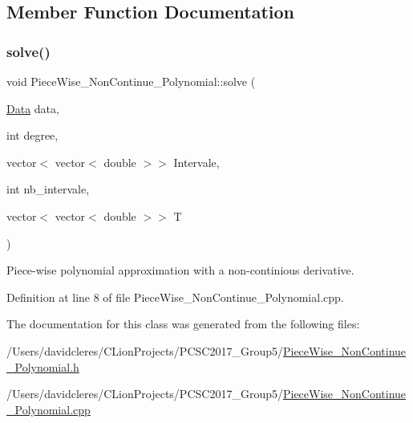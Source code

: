 \subsection{Member Function Documentation}
\mbox{\label{class_piece_wise___non_continue___polynomial_a5d891bbe7a9f9c2d5d8f6a28b522bb52}} 
\subsubsection{\texorpdfstring{solve()}{solve()}}
{\footnotesize\ttfamily void Piece\+Wise\+\_\+\+Non\+Continue\+\_\+\+Polynomial\+::solve (\begin{DoxyParamCaption}\item[{\mbox{\hyperlink{struct_data}{Data}}}]{data,  }\item[{int}]{degree,  }\item[{vector$<$ vector$<$ double $>$$>$}]{Intervale,  }\item[{int}]{nb\+\_\+intervale,  }\item[{vector$<$ vector$<$ double $>$$>$}]{T }\end{DoxyParamCaption})}



Piece-\/wise polynomial approximation with a non-\/continious derivative. 



Definition at line 8 of file Piece\+Wise\+\_\+\+Non\+Continue\+\_\+\+Polynomial.\+cpp.



The documentation for this class was generated from the following files\+:\begin{DoxyCompactItemize}
\item 
/\+Users/davidcleres/\+C\+Lion\+Projects/\+P\+C\+S\+C2017\+\_\+\+Group5/\mbox{\hyperlink{_piece_wise___non_continue___polynomial_8h}{Piece\+Wise\+\_\+\+Non\+Continue\+\_\+\+Polynomial.\+h}}\item 
/\+Users/davidcleres/\+C\+Lion\+Projects/\+P\+C\+S\+C2017\+\_\+\+Group5/\mbox{\hyperlink{_piece_wise___non_continue___polynomial_8cpp}{Piece\+Wise\+\_\+\+Non\+Continue\+\_\+\+Polynomial.\+cpp}}\end{DoxyCompactItemize}
